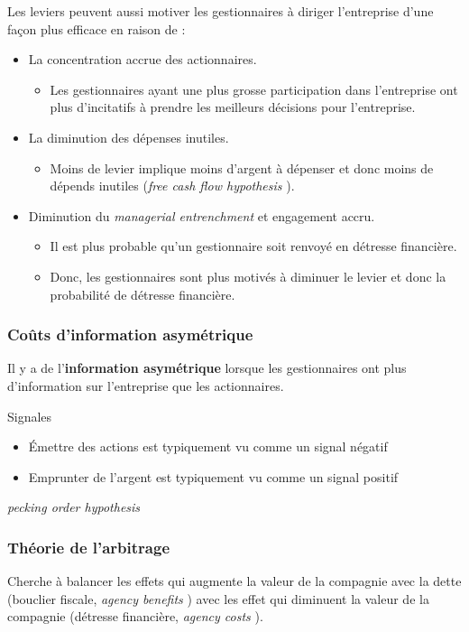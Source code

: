 \documentclass[10pt, french]{article}
\begin{document}
\begin{multicols*}{2}
Les leviers peuvent aussi motiver les gestionnaires à diriger l'entreprise d'une façon plus efficace en raison de : 
\begin{itemize}
	\item	La concentration accrue des actionnaires.
		\begin{itemize}
		\item	Les gestionnaires ayant une plus grosse participation dans l'entreprise ont plus d'incitatifs à prendre les meilleurs décisions pour l'entreprise.
		\end{itemize}
	\item	La diminution des dépenses inutiles.
		\begin{itemize}
		\item	Moins de levier implique moins d'argent à dépenser et donc moins de dépends inutiles (\og \textit{free cash flow hypothesis} \fg{}).
		\end{itemize}
	\item	Diminution du \og \textit{managerial entrenchment} \fg{} et engagement accru.
		\begin{itemize}
		\item	Il est plus probable qu'un gestionnaire soit renvoyé en détresse financière.
		\item	Donc, les gestionnaires sont plus motivés à diminuer le levier et donc la probabilité de détresse financière.
		\end{itemize}
\end{itemize}


\subsubsection{Coûts d'information asymétrique}
Il y a de l'\textbf{information asymétrique} lorsque les gestionnaires ont plus d'information sur l'entreprise que les actionnaires.

Signales

\begin{itemize}
	\item	Émettre des actions est typiquement vu comme un signal négatif
	\item	Emprunter de l'argent est typiquement vu comme un signal positif
\end{itemize}

\og \textit{pecking order hypothesis} \fg{}


\subsubsection{Théorie de l'arbitrage}
Cherche à balancer les effets qui augmente la valeur de la compagnie avec la dette (bouclier fiscale, \og \textit{agency benefits} \fg{}) avec les effet qui diminuent la valeur de la compagnie (détresse financière, \og \textit{agency costs} \fg{}).


\end{multicols*}
\end{document}
